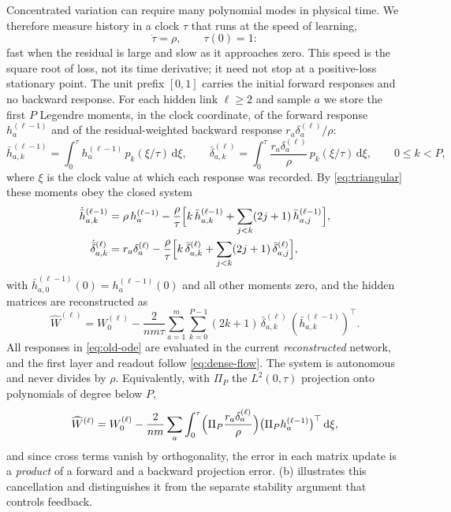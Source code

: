 \documentclass[11pt]{article}
\theoremstyle{definition}
\theoremstyle{remark}
\newcommand{\dd}{\,\mathrm{d}}
\begin{document}
Concentrated variation can require many polynomial modes in physical time.
We therefore measure history in a clock
$\tau$ that runs at the speed of learning,
\begin{equation}
 \dot\tau=\rho,\qquad \tau(0)=1:                        \label{eq:old-clock}
\end{equation}
fast when the residual is large and slow as it approaches zero.  This speed is
the square root of loss, not its time derivative; it need not stop at a
positive-loss stationary point.  The unit prefix
$[0,1]$ carries the initial forward responses and no backward response.  For
each hidden link $\ell\ge2$ and sample $a$ we store the first $P$ Legendre
moments, in the clock coordinate, of the forward response $h_a^{(\ell-1)}$ and
of the residual-weighted backward response $r_a\delta_a^{(\ell)}/\rho$:
\[
 \bar h^{(\ell-1)}_{a,k}=\int_0^{\tau} h_a^{(\ell-1)}\,p_k(\xi/\tau)\dd\xi,\qquad
 \bar\delta^{(\ell)}_{a,k}=\int_0^{\tau}\frac{r_a\delta_a^{(\ell)}}{\rho}\,
 p_k(\xi/\tau)\dd\xi,\qquad 0\le k<P,
\]
where $\xi$ is the clock value at which each response was recorded.  By
\eqref{eq:triangular} these moments obey the closed system
\begin{align}
 \dot{\bar h}^{(\ell-1)}_{a,k}&=\rho\,h_a^{(\ell-1)}-\frac{\rho}{\tau}
 \Bigl[k\,\bar h^{(\ell-1)}_{a,k}+\sum_{j<k}(2j+1)\,\bar h^{(\ell-1)}_{a,j}\Bigr],\nonumber\\
 \dot{\bar\delta}^{(\ell)}_{a,k}&=r_a\delta_a^{(\ell)}-\frac{\rho}{\tau}
 \Bigl[k\,\bar\delta^{(\ell)}_{a,k}+\sum_{j<k}(2j+1)\,\bar\delta^{(\ell)}_{a,j}\Bigr],
 \label{eq:old-ode}
\end{align}
with $\bar h^{(\ell-1)}_{a,0}(0)=h_a^{(\ell-1)}(0)$ and all other moments zero, and
the hidden matrices are reconstructed as
\begin{equation}
 \widehat W^{(\ell)}=W_0^{(\ell)}-\frac{2}{nm\tau}
 \sum_{a=1}^m\sum_{k=0}^{P-1}(2k+1)\,
 \bar\delta^{(\ell)}_{a,k}\,(\bar h^{(\ell-1)}_{a,k})^\top .   \label{eq:old-recon}
\end{equation}
All responses in \eqref{eq:old-ode} are evaluated in the current
\emph{reconstructed} network, and the first layer and readout follow
\eqref{eq:dense-flow}.  The system is autonomous and never divides by $\rho$.
Equivalently, with $\Pi_P$ the $L^2(0,\tau)$ projection onto polynomials of
degree below $P$,
\begin{equation}
 \widehat W^{(\ell)}=W_0^{(\ell)}-\frac{2}{nm}\sum_a
 \int_0^\tau\Bigl(\Pi_P\frac{r_a\delta_a^{(\ell)}}{\rho}\Bigr)
 \bigl(\Pi_Ph_a^{(\ell-1)}\bigr)^\top\dd\xi,               \label{eq:projection-form}
\end{equation}
and since cross terms vanish by orthogonality, the error in each matrix update is
a \emph{product} of a forward and a backward projection error.
(b) illustrates this cancellation and distinguishes it from
the separate stability argument that controls feedback.
\end{document}
